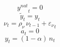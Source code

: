 \begin{dmath}
{{y^{nat}}}_{t}=0
\end{dmath}
\begin{dmath}
{{\tilde y}}_{t}={{y}}_{t}
\end{dmath}
\begin{dmath}
{{\nu}}_{t}={{\rho_{\nu}}}\, {{\nu}}_{t-1}+{{\varepsilon_\nu}}_{t}
\end{dmath}
\begin{dmath}
{{a}}_{t}=0
\end{dmath}
\begin{dmath}
{{y}}_{t}=\left(1-{{\alpha}}\right)\, {{n}}_{t}
\end{dmath}

